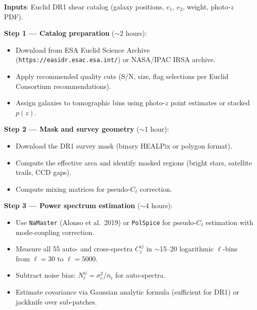 \documentclass[11pt,a4paper]{article}
\begin{document}
\begin{pipelinebox}

\textbf{Inputs}: Euclid DR1 shear catalog (galaxy positions, $e_1$, $e_2$,
weight, photo-$z$ PDF).

\medskip
\textbf{Step 1 --- Catalog preparation} ($\sim$2 hours):
\begin{itemize}[nosep]
\item Download from ESA Euclid Science Archive
  (\texttt{https://easidr.esac.esa.int/}) or NASA/IPAC IRSA archive.
\item Apply recommended quality cuts (S/N, size, flag selections per
  Euclid Consortium recommendations).
\item Assign galaxies to tomographic bins using photo-$z$ point estimates
  or stacked $p(z)$.
\end{itemize}

\textbf{Step 2 --- Mask and survey geometry} ($\sim$1 hour):
\begin{itemize}[nosep]
\item Download the DR1 survey mask (binary HEALPix or polygon format).
\item Compute the effective area and identify masked regions (bright
  stars, satellite trails, CCD gaps).
\item Compute mixing matrices for pseudo-$C_\ell$ correction.
\end{itemize}

\textbf{Step 3 --- Power spectrum estimation} ($\sim$4 hours):
\begin{itemize}[nosep]
\item Use \texttt{NaMaster} (Alonso et al.\ 2019) or \texttt{PolSpice}
  for pseudo-$C_\ell$ estimation with mode-coupling correction.
\item Measure all 55 auto- and cross-spectra $C_\ell^{ij}$ in
  $\sim$15--20 logarithmic $\ell$-bins from $\ell = 30$ to $\ell = 5000$.
\item Subtract noise bias: $N_\ell^{ii} = \sigma_e^2/\bar{n}_i$ for
  auto-spectra.
\item Estimate covariance via Gaussian analytic formula (sufficient for
  DR1) or jackknife over sub-patches.
\end{itemize}


\end{pipelinebox}
\end{document}
